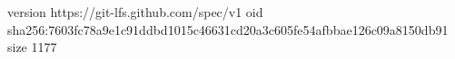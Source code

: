 version https://git-lfs.github.com/spec/v1
oid sha256:7603fc78a9e1c91ddbd1015c46631cd20a3c605fe54afbbae126c09a8150db91
size 1177
